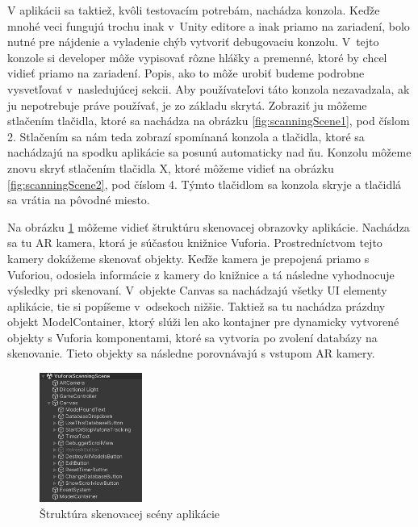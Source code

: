 V aplikácii sa taktiež, kvôli testovacím potrebám, nachádza konzola. Keďže mnohé veci fungujú trochu inak v~Unity editore a inak priamo na zariadení, bolo nutné pre nájdenie a vyladenie chýb vytvoriť debugovaciu konzolu. V~tejto konzole si developer môže vypisovať rôzne hlášky a premenné, ktoré by chcel vidieť priamo na zariadení. Popis, ako to môže urobiť budeme podrobne vysvetľovať v~nasledujúcej sekcii. Aby používateľovi táto konzola nezavadzala, ak ju nepotrebuje práve používať, je zo základu skrytá. Zobraziť ju môžeme stlačením tlačidla, ktoré sa nachádza na obrázku \ref{fig:scanningScene1}, pod číslom 2. Stlačením sa nám teda zobrazí spomínaná konzola a tlačidla, ktoré sa nachádzajú na spodku aplikácie sa posunú automaticky nad ňu. Konzolu môžeme znovu skryť stlačením tlačidla X, ktoré môžeme vidieť na obrázku \ref{fig:scanningScene2}, pod číslom 4. Týmto tlačidlom sa konzola skryje a tlačidlá sa vrátia na pôvodné miesto.

\FloatBarrier 


Na obrázku \ref{fig:scanningSceneStructure} môžeme vidieť štruktúru skenovacej obrazovky aplikácie. Nachádza sa tu AR kamera, ktorá je súčasťou knižnice Vuforia. Prostredníctvom tejto kamery dokážeme skenovať objekty. Keďže kamera je prepojená priamo s Vuforiou, odosiela informácie z kamery do knižnice a tá následne vyhodnocuje výsledky pri skenovaní. V~objekte Canvas sa nachádzajú všetky UI elementy aplikácie, tie si popíšeme v~odsekoch nižšie. Taktiež sa tu nachádza prázdny objekt ModelContainer, ktorý slúži len ako kontajner pre dynamicky vytvorené objekty s Vuforia komponentami, ktoré sa vytvoria po zvolení databázy na skenovanie. Tieto objekty sa následne porovnávajú s vstupom AR kamery.   

\begin{figure}[h]
  \centering
  \includegraphics[width=0.3\textwidth]{img/structure_scanning.png}
  \caption{Štruktúra skenovacej scény aplikácie}
  \label{fig:scanningSceneStructure}
\end{figure}

